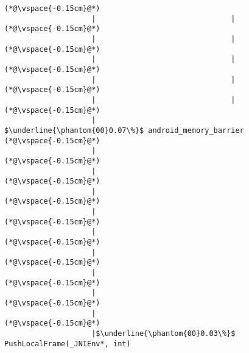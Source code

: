 \begin{lstlisting}[caption=Metodikutsu C$\to$Java 20 int-parametrilla, label=profile:C2JBenchmark00146, numberbychapter=true, frame=lines, float, floatplacement=t]
(*@\vspace{-0.15cm}@*)
                    |                               |
(*@\vspace{-0.15cm}@*)
                    |                               |
(*@\vspace{-0.15cm}@*)
                    |                               |
(*@\vspace{-0.15cm}@*)
                    |                               |
(*@\vspace{-0.15cm}@*)
                    |                               |
(*@\vspace{-0.15cm}@*)
                    |                                $\underline{\phantom{00}0.07\%}$ android_memory_barrier
(*@\vspace{-0.15cm}@*)
                    |        
(*@\vspace{-0.15cm}@*)
                    |        
(*@\vspace{-0.15cm}@*)
                    |        
(*@\vspace{-0.15cm}@*)
                    |        
(*@\vspace{-0.15cm}@*)
                    |        
(*@\vspace{-0.15cm}@*)
                    |        
(*@\vspace{-0.15cm}@*)
                    |        
(*@\vspace{-0.15cm}@*)
                    |
(*@\vspace{-0.15cm}@*)
                    |
(*@\vspace{-0.15cm}@*)
                    |$\underline{\phantom{00}0.03\%}$ PushLocalFrame(_JNIEnv*, int)


\end{lstlisting}

